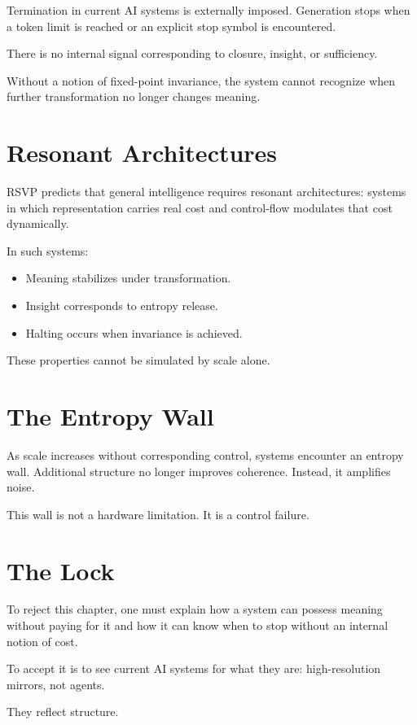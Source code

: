 \documentclass[11pt]{book}
\begin{document}
Termination in current AI systems is externally imposed. Generation stops when a token limit is reached or an explicit stop symbol is encountered.

There is no internal signal corresponding to closure, insight, or sufficiency.

Without a notion of fixed-point invariance, the system cannot recognize when further transformation no longer changes meaning.

\section{Resonant Architectures}

RSVP predicts that general intelligence requires resonant architectures: systems in which representation carries real cost and control-flow modulates that cost dynamically.

In such systems:
\begin{itemize}
\item Meaning stabilizes under transformation.
\item Insight corresponds to entropy release.
\item Halting occurs when invariance is achieved.
\end{itemize}

These properties cannot be simulated by scale alone.

\section{The Entropy Wall}

As scale increases without corresponding control, systems encounter an entropy wall. Additional structure no longer improves coherence. Instead, it amplifies noise.

This wall is not a hardware limitation. It is a control failure.

\section{The Lock}

To reject this chapter, one must explain how a system can possess meaning without paying for it and how it can know when to stop without an internal notion of cost.

To accept it is to see current AI systems for what they are: high-resolution mirrors, not agents.

They reflect structure.
\end{document}
